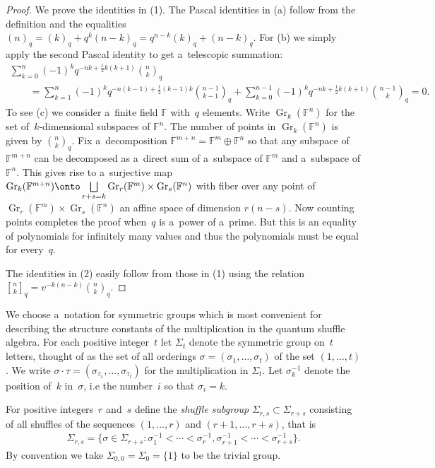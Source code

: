 \begin{proof}
We prove the identities in (1).
The Pascal identities in (a) follow from the def\/inition and the equalities
$(n)_q=(k)_q+q^k(n-k)_q=q^{n-k}(k)_q+(n-k)_q$.
For (b) we simply apply the second Pascal identity to get a~telescopic summation:
\begin{gather*}
\sum\limits_{k=0}^n (-1)^k q^{-nk+\frac{1}{2} k(k+1)}{n\choose k}_q
\\
\qquad
=\sum\limits_{k=1}^n (-1)^k
q^{-n(k-1)+\frac{1}{2}(k-1)k}{n-1\choose k-1}_q+\sum\limits_{k=0}^{n-1} (-1)^k q^{-nk+\frac{1}{2} k(k+1)}{n-1\choose
k}_q=0.
\end{gather*}
To see (c) we consider a~f\/inite f\/ield $\mathbb{F}$ with~$q$ elements.
Write $\operatorname{Gr}_k(\mathbb{F}^n)$ for the set of~$k$-dimensional subspaces of $\mathbb{F}^n$.
The number of points in $\operatorname{Gr}_k(\mathbb{F}^n)$ is given by ${n\choose k}_q$.
Fix a~decomposition $\mathbb{F}^{m+n}=\mathbb{F}^m\oplus\mathbb{F}^n$ so that any subspace of $\mathbb{F}^{m+n}$ can be
decomposed as a~direct sum of a~subspace of $\mathbb{F}^m$ and a~subspace of $\mathbb{F}^n$.
This gives rise to a~surjective map $\operatorname{Gr}_k(\mathbb{F}^{m+n})\onto \bigsqcup\limits_{r+s=k}\operatorname{Gr}_r(\mathbb{F}^m)\times\operatorname{Gr}_s(\mathbb{F}^n)$ with f\/iber over any point
of $\operatorname{Gr}_r(\mathbb{F}^m)\times\operatorname{Gr}_s(\mathbb{F}^n)$ an af\/f\/ine space of dimension $r(n-s)$.
Now counting points completes the proof when~$q$ is a~power of a~prime.
But this is an equality of polynomials for inf\/initely many values and thus the polynomials must be equal for every~$q$.

The identities in (2) easily follow from those in (1) using the relation ${n\brack k}_q=v^{-k(n-k)}{n\choose k}_q$.
\end{proof}

We choose a~notation for symmetric groups which is most convenient for describing the structure constants of the
multiplication in the quantum shuf\/f\/le algebra.
For each positive integer~$t$ let $\Sigma_t$ denote the symmetric group on~$t$ letters, thought of as the set of all
orderings $\sigma=(\sigma_1,\ldots,\sigma_t)$ of the set $(1,\ldots,t)$.
We write $\sigma\cdot\tau=(\sigma_{\tau_1},\ldots,\sigma_{\tau_t})$ for the multiplication in $\Sigma_t$.
Let $\sigma^{-1}_k$ denote the position of~$k$ in~$\sigma$, i.e the number~$i$ so that $\sigma_i=k$.

For positive integers~$r$ and~$s$ def\/ine the \emph{shuffle subgroup} $\Sigma_{r,s}\subset\Sigma_{r+s}$ consisting of all
shuf\/f\/les of the sequences $(1,\ldots,r)$ and $(r+1,\ldots,r+s)$, that is
\begin{gather*}
\Sigma_{r,s}=\big\{\sigma\in\Sigma_{r+s}: \sigma^{-1}_1<\cdots<\sigma^{-1}_r, \sigma^{-1}_{r+1}<\cdots<\sigma^{-1}_{r+s}\big\}.
\end{gather*}
By convention we take $\Sigma_{0,0}=\Sigma_0=\{1\}$ to be the trivial group.

